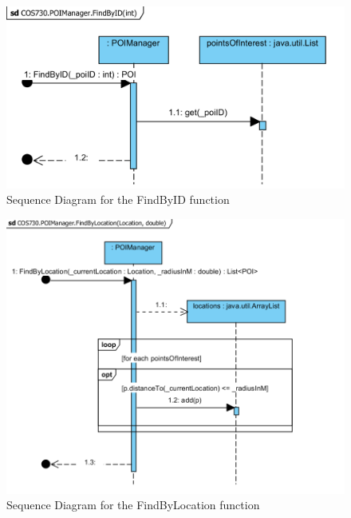 \begin{figure}[!htb]
\includegraphics[width=\textwidth]{Images/FindByID_Sequence.png}
\caption{Sequence Diagram for the FindByID function}
\end{figure}

\begin{figure}[!htb]
\includegraphics[width=\textwidth]{Images/FindByLocation_Sequence.png}
\caption{Sequence Diagram for the FindByLocation function}
\end{figure}

